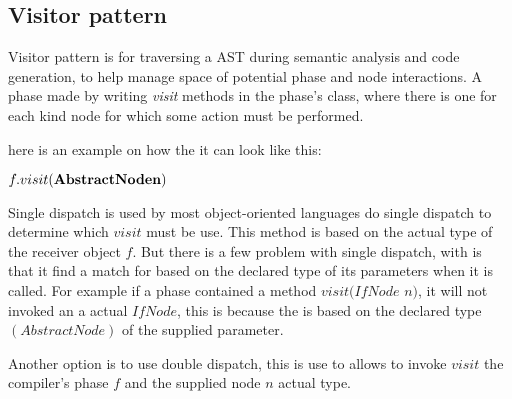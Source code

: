 \subsection{Visitor pattern}
\label{sec:VisitorPattern}
Visitor pattern is for traversing a AST during semantic analysis and code generation, to help manage space of potential phase and node interactions. A phase made by writing \textit{visit} methods in the phase's class, where there is one for each kind node for which some action must be performed.

here is an example on how the it can look like this:

$f.visit(\textbf{AbstractNode$ $n})$ 

Single dispatch is used by most object-oriented languages do single dispatch to determine which $visit$ must be use. This method is based on the actual type of the receiver object $f$. But there is a few problem with single dispatch, with is that it find a match for based on the declared type of its parameters when it is called. For example if a phase contained a method $visit(IfNode$ $n)$, it will not invoked an a actual $IfNode$, this is because the is based on the declared type $(AbstractNode)$ of the supplied parameter.

Another option is to use double dispatch, this is use to allows to invoke $visit$ the compiler's phase $f$ and the supplied node $n$ actual type.